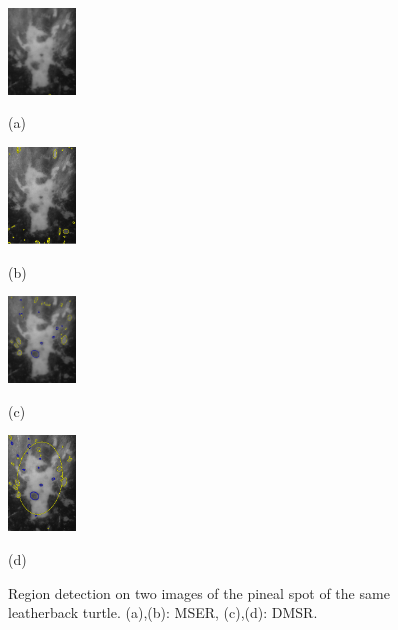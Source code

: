 \documentclass[conference,compsoc]{IEEEtran}
\begin{document}
\begin{figure}[htb]

\begin{minipage}[b]{.23\linewidth}
  \centering
  \centerline{\includegraphics[width=1.8cm]{mserLeatherbackA}}
   \centerline{(a)}\medskip
\end{minipage}
\hfill
\begin{minipage}[b]{0.23\linewidth}
  \centering
  \centerline{\includegraphics[width=1.8cm]{mserLeatherbackB}}
\centerline{(b)}\medskip
\end{minipage}
\hfill
\begin{minipage}[b]{.23\linewidth}
  \centering
  \centerline{\includegraphics[width=1.8cm]{dmsrLeatherbackA}}
\centerline{(c)}\medskip
\end{minipage}
\hfill
\begin{minipage}[b]{0.23\linewidth}
  \centering
  \centerline{\includegraphics[width=1.8cm]{dmsrLeatherbackB}}
 \centerline{(d)}\medskip
\end{minipage}
 \vspace{-0.2cm} 
\caption{Region detection on two images of the pineal spot of the same leatherback turtle.
(a),(b): MSER, (c),(d): DMSR.}
\label{fig:turtle}
 \vspace{-0.2cm}
\end{figure}
\end{document}
